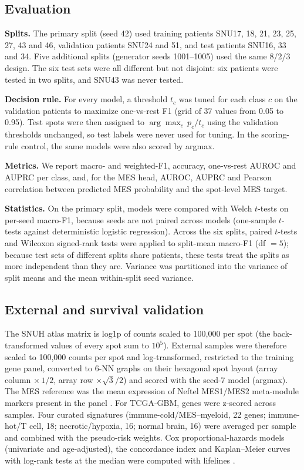 \documentclass[11pt,letterpaper]{article}
\begin{document}
\subsection{Evaluation}

\textbf{Splits.} The primary split (seed 42) used training patients SNU17, 18, 21, 23, 25, 27, 43 and 46, validation patients SNU24 and 51, and test patients SNU16, 33 and 34. Five additional splits (generator seeds 1001--1005) used the same 8/2/3 design. The six test sets were all different but not disjoint: six patients were tested in two splits, and SNU43 was never tested.

\textbf{Decision rule.} For every model, a threshold $t_c$ was tuned for each class $c$ on the validation patients to maximize one-vs-rest F1 (grid of 37 values from 0.05 to 0.95). Test spots were then assigned to $\arg\max_c\, p_c / t_c$ using the validation thresholds unchanged, so test labels were never used for tuning. In the scoring-rule control, the same models were also scored by argmax.

\textbf{Metrics.} We report macro- and weighted-F1, accuracy, one-vs-rest AUROC and AUPRC per class, and, for the MES head, AUROC, AUPRC and Pearson correlation between predicted MES probability and the spot-level MES target.

\textbf{Statistics.} On the primary split, models were compared with Welch $t$-tests on per-seed macro-F1, because seeds are not paired across models (one-sample $t$-tests against deterministic logistic regression). Across the six splits, paired $t$-tests and Wilcoxon signed-rank tests were applied to split-mean macro-F1 (df $= 5$); because test sets of different splits share patients, these tests treat the splits as more independent than they are. Variance was partitioned into the variance of split means and the mean within-split seed variance.

\subsection{External and survival validation}

The SNUH atlas matrix is log1p of counts scaled to 100{,}000 per spot (the back-transformed values of every spot sum to $10^5$). External samples were therefore scaled to 100{,}000 counts per spot and log-transformed, restricted to the training gene panel, converted to 6-NN graphs on their hexagonal spot layout (array column $\times\,1/2$, array row $\times \sqrt{3}/2$) and scored with the seed-7 model (argmax). The MES reference was the mean expression of Neftel MES1/MES2 meta-module markers present in the panel \cite{neftel2019}. For TCGA-GBM, genes were z-scored across samples. Four curated signatures (immune-cold/MES--myeloid, 22 genes; immune-hot/T cell, 18; necrotic/hypoxia, 16; normal brain, 16) were averaged per sample and combined with the pseudo-risk weights. Cox proportional-hazards models (univariate and age-adjusted), the concordance index and Kaplan--Meier curves with log-rank tests at the median were computed with lifelines \cite{davidsonpilon2019}.
\end{document}
